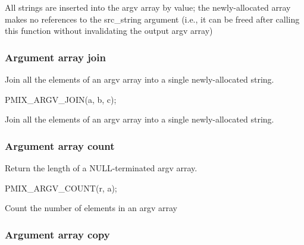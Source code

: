 \adviceuserstart
All strings are inserted into the argv array by value; the newly-allocated array makes no references to the src_string argument (i.e., it can be freed after calling this function without invalidating the output argv array)
\adviceuserend

\subsubsection{Argument array join}

\summary

Join all the elements of an argv array into a single newly-allocated string.

\cspecificstart
\begin{codepar}
PMIX_ARGV_JOIN(a, b, c);
\end{codepar}
\cspecificend

\begin{arglist}
\end{arglist}

\descr

Join all the elements of an argv array into a single newly-allocated string.

\subsubsection{Argument array count}

\summary

Return the length of a NULL-terminated argv array.

\cspecificstart
\begin{codepar}
PMIX_ARGV_COUNT(r, a);
\end{codepar}
\cspecificend

\begin{arglist}
\end{arglist}

\descr

Count the number of elements in an argv array


\subsubsection{Argument array copy}

